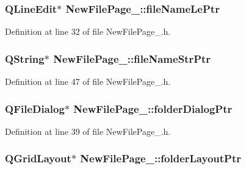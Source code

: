 \hypertarget{class_new_file_page__4_a145cc995d3737d3d73ad1ed18c91492c}{
\subsubsection[{file\-Name\-Le\-Ptr}]{\setlength{\rightskip}{0pt plus 5cm}Q\-Line\-Edit$\ast$ New\-File\-Page\-\_\-::file\-Name\-Le\-Ptr\hspace{0.3cm}{\ttfamily [private]}}}\label{class_new_file_page__4_a145cc995d3737d3d73ad1ed18c91492c}


Definition at line 32 of file New\-File\-Page\-\_.\-h.

\hypertarget{class_new_file_page__4_aa44cfefe988a3e7a5bf85547683636bc}{
\subsubsection[{file\-Name\-Str\-Ptr}]{\setlength{\rightskip}{0pt plus 5cm}Q\-String$\ast$ New\-File\-Page\-\_\-::file\-Name\-Str\-Ptr\hspace{0.3cm}{\ttfamily [private]}}}\label{class_new_file_page__4_aa44cfefe988a3e7a5bf85547683636bc}


Definition at line 47 of file New\-File\-Page\-\_.\-h.

\hypertarget{class_new_file_page__4_a4d3e4936410b7c135b1150b7840bc411}{
\subsubsection[{folder\-Dialog\-Ptr}]{\setlength{\rightskip}{0pt plus 5cm}Q\-File\-Dialog$\ast$ New\-File\-Page\-\_\-::folder\-Dialog\-Ptr\hspace{0.3cm}{\ttfamily [private]}}}\label{class_new_file_page__4_a4d3e4936410b7c135b1150b7840bc411}


Definition at line 39 of file New\-File\-Page\-\_.\-h.

\hypertarget{class_new_file_page__4_ae35f4a21e38b5d0849b580bc45b1af6d}{
\subsubsection[{folder\-Layout\-Ptr}]{\setlength{\rightskip}{0pt plus 5cm}Q\-Grid\-Layout$\ast$ New\-File\-Page\-\_\-::folder\-Layout\-Ptr\hspace{0.3cm}{\ttfamily [private]}}}\label{class_new_file_page__4_ae35f4a21e38b5d0849b580bc45b1af6d}


